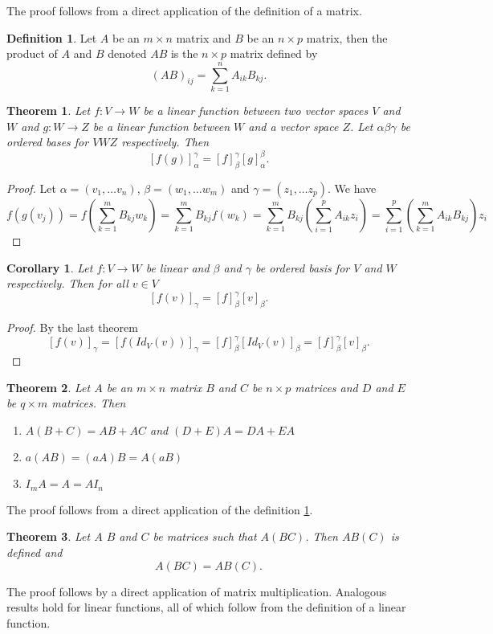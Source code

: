 \documentclass[oneside, 12pt]{book}
\newtheorem{thm}{Theorem}[section]
\newtheorem{cor}{Corollary}[section]
\theoremstyle{definition}
\newtheorem{defn}{Definition}[section]
\begin{document}
The proof follows from a direct application of the definition of a matrix.
\begin{defn}
\label{defn_matprod}
  Let $A$ be an $m \times n$ matrix and $B$ be an $n \times p$ matrix, then the product of $A$ and $B$ denoted $AB$ is the $n \times p$ matrix defined by
  \[(AB)_{ij}=\sum_{k=1}^{n}A_{ik}B_{kj}.\]
\end{defn}
\begin{thm}
\label{thm_matprod}
  Let $f: V \to W$ be a linear function between two vector spaces $V$ and $W$ and $g: W \to Z$ be a linear function between $W$ and a vector space $Z$. Let $\alpha \beta \gamma$ be ordered bases for $V W Z$ respectively. Then
  \[[f(g)]_{\alpha}^{\gamma}=[f]_{\beta}^{\gamma}[g]_{\alpha}^{\beta}.\]
\end{thm}
\begin{proof}
  Let $\alpha=(v_{1}, \dots v_{n})$, $\beta=(w_{1}, \dots w_{m})$ and $\gamma=(z_{1}, \dots z_{p})$. We have \[f(g(v_{j}))=f(\sum_{k=1}^{m}B_{kj}w_{k})=\sum_{k=1}^{m}B_{kj}f(w_{k})=\sum_{k=1}^{m}B_{kj}(\sum_{i=1}^{p}A_{ik}z_{i})=\sum_{i=1}^{p}(\sum_{k=1}^{m}A_{ik}B_{kj})z_{i}\]
\end{proof}
\begin{cor}
  \label{cor_matapp}
  Let $f: V \to W$ be linear and $\beta$ and $\gamma$ be ordered basis for $V$ and $W$ respectively. Then for all $v \in V$
  \[[f(v)]_{\gamma}=[f]_{\beta}^{\gamma}[v]_{\beta}.\]
\end{cor}
\begin{proof}
By the last theorem
\[[f(v)]_{\gamma}=[f(Id_{V}(v))]_{\gamma}=[f]_{\beta}^{\gamma}[Id_{V}(v)]_{\beta}=[f]_{\beta}^{\gamma}[v]_{\beta}.\]
\end{proof}

\begin{thm}
\label{thm_matt}
  Let $A$ be an $m \times n$ matrix $B$ and $C$ be $n \times p$ matrices and $D$ and $E$ be $q \times m$ matrices. Then
  \begin{enumerate}
    \item $A(B+C)=AB+AC$ and $(D+E)A=DA+EA$
    \item $a(AB)=(aA)B=A(aB)$
    \item$I_{m}A=A=AI_{n}$
  \end{enumerate}
\end{thm}
The proof follows from a direct application of the definition \ref{defn_matprod}.
\begin{thm}
\label{mat_assc}
  Let $A$ $B$ and $C$ be matrices such that $A(BC)$. Then $AB(C)$ is defined and \[A(BC)=AB(C).\]
\end{thm}
The proof follows by a direct application of matrix multiplication. Analogous results hold for linear functions, all of which follow from the definition of a linear function.
\end{document}
